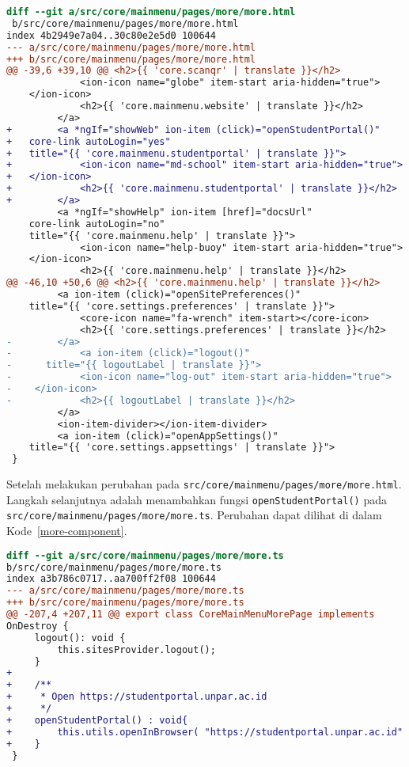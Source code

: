 \begin{lstlisting}[language=diff, frame=single, label ={more-view}, caption = Perubahan pada file \texttt{src/core/mainmenu/pages/more/more.html} ]
diff --git a/src/core/mainmenu/pages/more/more.html
 b/src/core/mainmenu/pages/more/more.html
index 4b2949e7a04..30c80e2e5d0 100644
--- a/src/core/mainmenu/pages/more/more.html
+++ b/src/core/mainmenu/pages/more/more.html
@@ -39,6 +39,10 @@ <h2>{{ 'core.scanqr' | translate }}</h2>
             <ion-icon name="globe" item-start aria-hidden="true">
	</ion-icon>
             <h2>{{ 'core.mainmenu.website' | translate }}</h2>
         </a>
+        <a *ngIf="showWeb" ion-item (click)="openStudentPortal()" 
+ 	core-link autoLogin="yes" 
+ 	title="{{ 'core.mainmenu.studentportal' | translate }}">
+            <ion-icon name="md-school" item-start aria-hidden="true">
+ 	</ion-icon>
+            <h2>{{ 'core.mainmenu.studentportal' | translate }}</h2>
+        </a>
         <a *ngIf="showHelp" ion-item [href]="docsUrl" 
	core-link autoLogin="no" 
	title="{{ 'core.mainmenu.help' | translate }}">
             <ion-icon name="help-buoy" item-start aria-hidden="true">
	</ion-icon>
             <h2>{{ 'core.mainmenu.help' | translate }}</h2>
@@ -46,10 +50,6 @@ <h2>{{ 'core.mainmenu.help' | translate }}</h2>
         <a ion-item (click)="openSitePreferences()" 
	title="{{ 'core.settings.preferences' | translate }}">
             <core-icon name="fa-wrench" item-start></core-icon>
             <h2>{{ 'core.settings.preferences' | translate }}</h2>
-        </a>
-            <a ion-item (click)="logout()" 
- 	   title="{{ logoutLabel | translate }}">
-            <ion-icon name="log-out" item-start aria-hidden="true">
- 	 </ion-icon>
-            <h2>{{ logoutLabel | translate }}</h2>
         </a>
         <ion-item-divider></ion-item-divider>
         <a ion-item (click)="openAppSettings()" 
	title="{{ 'core.settings.appsettings' | translate }}">
 }
\end{lstlisting} 

Setelah melakukan perubahan pada \texttt{src/core/mainmenu/pages/more/more.html}. Langkah selanjutnya adalah menambahkan fungsi \texttt{openStudentPortal()} pada \texttt{src/core/mainmenu/pages/more/more.ts}. Perubahan dapat dilihat di dalam \mbox{Kode \ref{more-component}}.

\begin{lstlisting}[language=diff, frame=single, label ={more-component}, caption = Perubahan pada file \texttt{src/core/mainmenu/pages/more/more.ts} ]
diff --git a/src/core/mainmenu/pages/more/more.ts
b/src/core/mainmenu/pages/more/more.ts
index a3b786c0717..aa700ff2f08 100644
--- a/src/core/mainmenu/pages/more/more.ts
+++ b/src/core/mainmenu/pages/more/more.ts
@@ -207,4 +207,11 @@ export class CoreMainMenuMorePage implements 
OnDestroy {
     logout(): void {
         this.sitesProvider.logout();
     }
+
+    /**
+     * Open https://studentportal.unpar.ac.id
+     */
+    openStudentPortal() : void{
+        this.utils.openInBrowser( "https://studentportal.unpar.ac.id" );
+    }
 }
\end{lstlisting} 

